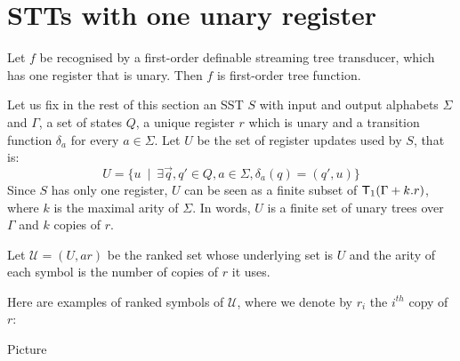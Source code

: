 \section{STTs with one unary register}
\label{sec:one-register}



\begin{lemma}\label{lem:one-register}
    Let $f$ be recognised by a first-order definable streaming tree transducer, which has one register that is unary. Then $f$ is first-order tree function.
\end{lemma}

Let us fix in the rest of this section an SST $S$ with input and output alphabets $\Sigma$ and $\Gamma$, a set of states $Q$, a unique register $r$ which is unary and a transition function $\delta_a$ for every $a\in \Sigma$. Let $U$ be the set of register updates used by $S$, that is:
$$U=\{u\ \mid\  \exists \vec{q}, q' \in Q, a\in \Sigma, \delta_a(q)=(q',u)\}$$
Since $S$ has only one register,  $U$ can be seen as a finite subset of  $\mathsf T_1( \Gamma + k.r)$, where $k$ is the maximal arity of $\Sigma$.
In words, $U$ is a finite set of unary trees over $\Gamma$ and $k$ copies of $r$.

Let $\mathcal{U}=(U,ar)$ be the ranked set whose underlying set is $U$ and the arity of each symbol is the number of copies of $r$ it uses. 

Here are examples of ranked symbols of $\mathcal{U}$, where we denote by $r_i$ the $i^{th}$ copy of $r$:
\begin{center}
Picture
\end{center}

